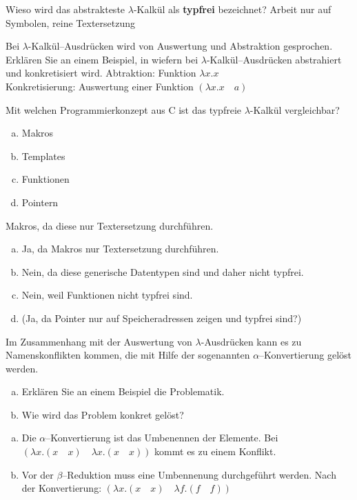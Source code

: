 \begin{card}
	Wieso wird das abstrakteste $\lambda$-Kalkül als \textbf{typfrei} bezeichnet?
	\hr
	Arbeit nur auf Symbolen, reine Textersetzung
\end{card}

\begin{card}
  Bei $\lambda$-Kalkül--Ausdrücken wird von Auswertung und Abstraktion gesprochen. Erklären Sie an einem Beispiel, in wiefern bei $\lambda$-Kalkül--Ausdrücken abstrahiert und konkretisiert wird.
  \hr
  Abtraktion: Funktion $\lambda x.x$\\
  Konkretisierung: Auswertung einer Funktion $(\lambda x.x \quad a)$
\end{card}

\begin{card}
  Mit welchen Programmierkonzept aus C ist das typfreie $\lambda$-Kalkül vergleichbar?
  \begin{enumerate}[a)]
    \item Makros
    \item Templates
    \item Funktionen
    \item Pointern
  \end{enumerate}
  \hr
  Makros, da diese nur Textersetzung durchführen.
  \begin{enumerate}[a)]
    \item Ja, da Makros nur Textersetzung durchführen.
    \item Nein, da diese generische Datentypen sind und daher nicht typfrei.
    \item Nein, weil Funktionen nicht typfrei sind.
    \item (Ja, da Pointer nur auf Speicheradressen zeigen und typfrei sind?)
  \end{enumerate}
\end{card}

\begin{card}
  Im Zusammenhang mit der Auswertung von $\lambda$-Ausdrücken kann es zu Namenskonflikten kommen, die mit Hilfe der sogenannten
  $\alpha$--Konvertierung gelöst werden.
  \begin{enumerate}[a)]
    \item Erklären Sie an einem Beispiel die Problematik.
    \item Wie wird das Problem konkret gelöst?
  \end{enumerate}
  \hr
  \begin{enumerate}[a)]
    \item Die $\alpha$--Konvertierung ist das Umbenennen der Elemente. Bei $(\lambda x.(x \quad x) \quad \lambda x.(x \quad x))$ kommt es zu einem Konflikt.
    \item Vor der $\beta$--Reduktion muss eine Umbennenung durchgeführt werden. Nach der Konvertierung: $(\lambda x.(x \quad x) \quad \lambda f.(f \quad f))$
  \end{enumerate}
\end{card}

